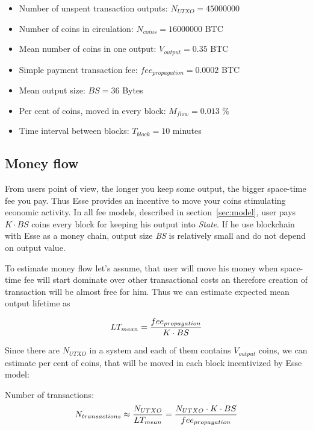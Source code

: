 \documentclass[]{article}   %
\newcommand{\authnote}[2]{\marginpar{\parbox{\marginparwidth}{\tiny %
  \textsf{#1 {\textcolor{blue}{notes: #2}}}}}%
  \textcolor{blue}{\textbf{\dag}}}
\newcommand{\authnote}[2]{
  \textsf{#1 \textcolor{blue}{: #2}}}
\newcommand{\authnote}[2]{}
\newcommand{\dnote}[1]{{\authnote{\textcolor{blue}{Dima notes}}{#1}}}
\newcommand{\esse}{Esse}
\newcommand{\state}{\textit{State}}
\begin{document}
\begin{itemize}
  \item Number of unspent transaction outputs: $N_{UTXO}=45000000$
  \item Number of coins in circulation: $N_{coins}=16000000$ BTC
  \item Mean number of coins in one output: $V_{output}=0.35$ BTC
  \item Simple payment transaction fee: $fee_{propagation}=0.0002$ BTC
  \item Mean output size: $BS=36$ Bytes
  \item Per cent of coins, moved in every block: $M_{flow}=0.013$ \%
  \item Time interval between blocks: $T_{block}=10$ minutes
\end{itemize}

\subsection{Money flow}
\label{sec:flow}

From users point of view, the longer you keep some output, the bigger space-time fee you pay. Thus \esse{} provides an incentive to move your coins stimulating economic activity. In all fee models, described in section~\ref{sec:model}, user pays ${K \cdot BS}$ coins every block for keeping his output into \state{}. If he use blockchain with \esse{} as a money chain, output size \textit{BS} is relatively small and do not depend on output value.

To estimate money flow let's assume, that user will move his money when space-time fee will start dominate over other transactional costs an therefore creation of transaction will be almost free for him. Thus we can estimate expected mean output lifetime as

\begin{equation}
\label{eq:ltmean}
LT_{mean}={fee_{propagation} \over K \cdot BS}
\end{equation}

Since there are $N_{UTXO}$ in a system and each of them contains $V_{output}$ coins, we can estimate per cent of coins, that will be moved in each block incentivized by \esse{} model:

\dnote{start: estimate number of transactions per block}
Number of transactions:
\begin{equation}
N_{transactions} \approx {N_{UTXO} \over LT_{mean}} = {N_{UTXO} \cdot K \cdot BS \over fee_{propagation}}
\end{equation}
\end{document}
